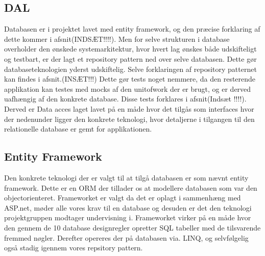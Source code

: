\subsection{DAL} 
Databasen er i projektet lavet med entity framework, og den præcise forklaring af dette kommer i afsnit(INDSÆT!!!!). Men for selve strukturen i database overholder den ønskede systemarkitektur, hvor hvert lag ønskes både udskifteligt og testbart, er der lagt et repository pattern ned over selve databasen. Dette gør databaseteknologien yderst udskiftelig. Selve forklaringen af repository patternet kan findes i afsnit.(INSÆT!!!) Dette gør tests noget nemmere, da den resterende applikation kan testes med mocks af den unitofwork der er brugt, og er derved uafhængig af den konkrete database. Disse tests forklares i afsnit(Indsæt !!!!). Derved er Data acces laget lavet på en måde hvor det tilgås som interfaces hvor der nedenunder ligger den konkrete teknologi, hvor detaljerne i tilgangen til den relationelle database er gemt for applikationen.      

\subsection{Entity Framework}
Den konkrete teknologi der er valgt til at tilgå databasen er som nævnt entity framework. Dette er en ORM der tillader os at modellere databasen som var den objectorienteret. Frameworket er valgt da det er oplagt i sammenhæng med ASP.net, møder alle vores krav til en database og desuden er det den teknologi projektgruppen modtager undervisning i. Frameworket virker på en måde hvor den gennem de 10 database designregler opretter SQL tabeller med de tilsvarende fremmed nøgler. Derefter  opereres der på databasen via. LINQ, og selvfølgelig også stadig igennem vores repsitory pattern.      